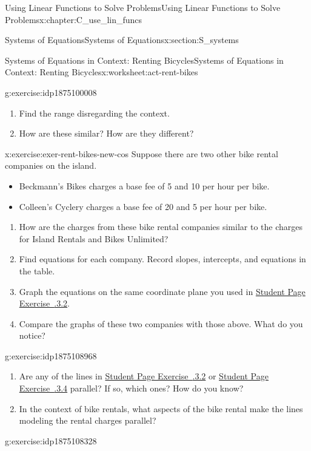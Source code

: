 \documentclass[oneside,10pt,]{book}
\newcommand{\xreffont}{\relax}
\numberwithin{equation}{chapter}
\begin{document}
\begin{chapterptx}{Using Linear Functions to Solve Problems}{}{Using Linear Functions to Solve Problems}{}{}{x:chapter:C_use_lin_funcs}
\begin{sectionptx}{Systems of Equations}{}{Systems of Equations}{}{}{x:section:S_systems}
\begin{worksheet-subsection}{Systems of Equations in Context: Renting Bicycles}{}{Systems of Equations in Context: Renting Bicycles}{}{}{x:worksheet:act-rent-bikes}
\begin{divisionexercise}{3}{}{}{g:exercise:idp1875100008}
\begin{enumerate}[font=\bfseries,label=(\alph*),ref=\alph*]
\item{}Find the range disregarding the context.%
\item{}How are these similar? How are they different?%
\end{enumerate}
\end{divisionexercise}%
\begin{divisionexercise}{4}{}{}{x:exercise:exer-rent-bikes-new-cos}%
Suppose there are two other bike rental companies on the island.%
\begin{itemize}[label=\textbullet]
\item{}Beckmann's Bikes charges a base fee of \textdollar{}5 and \textdollar{}10 per hour per bike.%
\item{}Colleen's Cyclery charges a base fee of \textdollar{}20 and \textdollar{}5 per hour per bike.%
\end{itemize}
%
\begin{enumerate}[font=\bfseries,label=(\alph*),ref=\alph*]
\item{}How are the charges from these bike rental companies similar to the charges for Island Rentals and Bikes Unlimited?%
\item{}Find equations for each company. Record slopes, intercepts, and equations in the table.%
\item{}Graph the equations on the same coordinate plane you used in \hyperlink{x:exercise:exer-rent-bikes-table}{Student Page Exercise~{\xreffont 3.5.3.2}}.%
\item{}Compare the graphs of these two companies with those above. What do you notice?%
\end{enumerate}
\end{divisionexercise}%
\begin{divisionexercise}{5}{}{}{g:exercise:idp1875108968}%
\begin{enumerate}[font=\bfseries,label=(\alph*),ref=\alph*]
\item{}Are any of the lines in \hyperlink{x:exercise:exer-rent-bikes-table}{Student Page Exercise~{\xreffont 3.5.3.2}} or \hyperlink{x:exercise:exer-rent-bikes-new-cos}{Student Page Exercise~{\xreffont 3.5.3.4}} parallel? If so, which ones? How do you know?%
\item{}In the context of bike rentals, what aspects of the bike rental make the lines modeling the rental charges parallel?%
\end{enumerate}
\end{divisionexercise}%
\begin{divisionexercise}{6}{}{}{g:exercise:idp1875108328}%

\end{divisionexercise}
\end{worksheet-subsection}
\end{sectionptx}
\end{chapterptx}
\end{document}
